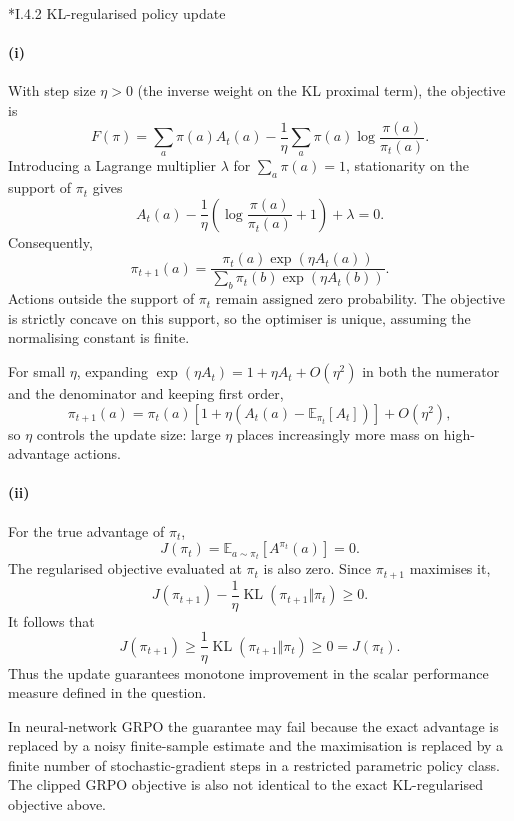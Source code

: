 \documentclass[11pt]{article}
\makeatletter
\let\origsubsec\subsection
\renewcommand{\subsection}{\@ifstar{\tx@subsec}{\origsubsec}}
\newcommand{\tx@subsec}[1]{\phantomsection\origsubsec*{#1}\addcontentsline{toc}{subsubsection}{#1}}
\makeatother
\begin{document}
\subsection*{I.4.2 KL-regularised policy update}

\paragraph{(i)}
With step size $\eta>0$ (the inverse weight on the KL proximal term), the objective is
\[
F(\pi)
=
\sum_a\pi(a)A_t(a)
-\frac{1}{\eta}
\sum_a\pi(a)\log\frac{\pi(a)}{\pi_t(a)}.
\]
Introducing a Lagrange multiplier $\lambda$ for $\sum_a\pi(a)=1$, stationarity
on the support of $\pi_t$ gives
\[
A_t(a)
-\frac{1}{\eta}
\left(
\log\frac{\pi(a)}{\pi_t(a)}+1
\right)
+\lambda=0.
\]
Consequently,
\[
\pi_{t+1}(a)
=
\frac{\pi_t(a)\exp(\eta A_t(a))}
{\sum_b\pi_t(b)\exp(\eta A_t(b))}.
\]
Actions outside the support of $\pi_t$ remain assigned zero probability. The
objective is strictly concave on this support, so the optimiser is unique,
assuming the normalising constant is finite.

For small $\eta$, expanding $\exp(\eta A_t)=1+\eta A_t+O(\eta^2)$ in both the numerator and the denominator and keeping first order,
\[
\pi_{t+1}(a)
=
\pi_t(a)
\left[
1+\eta\left(A_t(a)-\mathbb{E}_{\pi_t}[A_t]\right)
\right]
+O(\eta^2),
\]
so $\eta$ controls the update size: large $\eta$ places increasingly more mass on high-advantage actions.

\paragraph{(ii)}
For the true advantage of $\pi_t$,
\[
J(\pi_t)
=
\mathbb{E}_{a\sim\pi_t}[A^{\pi_t}(a)]
=0.
\]
The regularised objective evaluated at $\pi_t$ is also zero. Since
$\pi_{t+1}$ maximises it,
\[
J(\pi_{t+1})
-\frac{1}{\eta}
\operatorname{KL}(\pi_{t+1}\Vert\pi_t)
\geq 0.
\]
It follows that
\[
J(\pi_{t+1})
\geq
\frac{1}{\eta}
\operatorname{KL}(\pi_{t+1}\Vert\pi_t)
\geq 0
=
J(\pi_t).
\]
Thus the update guarantees monotone improvement in the scalar performance
measure defined in the question.

In neural-network GRPO the guarantee may fail because the exact advantage is
replaced by a noisy finite-sample estimate and the maximisation is replaced by
a finite number of stochastic-gradient steps in a restricted parametric policy
class. The clipped GRPO objective is also not identical to the exact
KL-regularised objective above.
\end{document}
